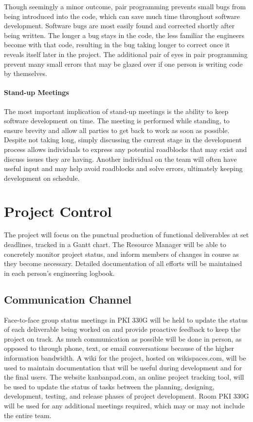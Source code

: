 Though seemingly a minor outcome, pair programming prevents small bugs from being introduced into the code, which can save much time throughout software development.
Software bugs are most easily found and corrected shortly after being written.
The longer a bug stays in the code, the less familiar the engineers become with that code, resulting in the bug taking longer to correct once it reveals itself later in the project.
The additional pair of eyes in pair programming prevent many small errors that may be glazed over if one person is writing code by themselves.
\paragraph{Stand-up Meetings}
The most important implication of stand-up meetings is the ability to keep software development on time.
The meeting is performed while standing, to ensure brevity and allow all parties to get back to work as soon as possible.
Despite not taking long, simply discussing the current stage in the development process allows individuals to express any potential roadblocks that may exist and discuss issues they are having.
Another individual on the team will often have useful input and may help avoid roadblocks and solve errors, ultimately keeping development on schedule. 

\section{Project Control}
The project will focus on the punctual production of functional deliverables at set deadlines, tracked in a Gantt chart.
The Resource Manager will be able to concretely monitor project status, and inform members of changes in course as they become necessary.
Detailed documentation of all efforts will be maintained in each person's engineering logbook.

\subsection{Communication Channel}
Face-to-face group status meetings in PKI 330G will be held to update the status of each deliverable being worked on and provide proactive feedback to keep the project on track.
As much communication as possible will be done in person, as opposed to through phone, text, or email conversations because of the higher information bandwidth.
A wiki for the project, hosted on wikispaces.com, will be used to maintain documentation that will be useful during development and for the final users. 
The website kanbanpad.com, an online project tracking tool, will be used to update the status of tasks between the planning, designing, development, testing, and release phases of project development.
Room PKI 330G will be used for any additional meetings required, which may or may not include the entire team.

